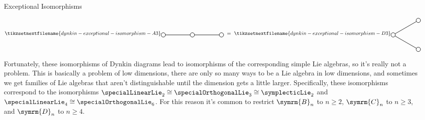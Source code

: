 \documentclass[fleqn]{NotesClass}
\newcommand{\isomorphic}{\cong}
\newcommand{\dynkin}[2]{\symrm{#1}_{#2}}
\begin{document}
\begin{remark}{Exceptional Isomorphisms}{}
\begin{itemize}
\begin{equation}
                \tikzsetnextfilename{dynkin-exceptional-isomorphism-A3}
                \begin{tikzpicture}[baseline=(current bounding box)]
                    \draw[thick] (0, 0) -- (4, 0);
                    \draw[thick, fill=white] (0, 0) circle [radius=0.15];
                    \draw[thick, fill=white] (2, 0) circle [radius=0.15];
                    \draw[thick, fill=white] (4, 0) circle [radius=0.15];
                \end{tikzpicture}
                \ =\ 
                \tikzsetnextfilename{dynkin-exceptional-isomorphism-D3}
                \begin{tikzpicture}[baseline=(current bounding box)]
                    \draw[thick] (0, 0) -- ++ (30:2);
                    \draw[thick] (0, 0) -- ++ (-30:2);
                    \draw[thick, fill=white] (0, 0) circle [radius=0.15];
                    \draw[thick, fill=white] (30:2) circle [radius=0.15];
                    \draw[thick, fill=white] (-30:2) circle [radius=0.15];
                \end{tikzpicture}
            \end{equation}
        \end{itemize}
        Fortunately, these isomorphisms of Dynkin diagrams lead to isomorphisms of the corresponding simple Lie algebras, so it's really not a problem.
        This is basically a problem of low dimensions, there are only so many ways to be a Lie algebra in low dimensions, and sometimes we get families of Lie algebras that aren't distinguishable until the dimension gets a little larger.
        Specifically, these isomorphisms correspond to the isomorphisms \(\specialLinearLie_2 \isomorphic \specialOrthogonalLie_3 \isomorphic \symplecticLie_2\) and \(\specialLinearLie_4 \isomorphic \specialOrthogonalLie_6\).
        For this reason it's common to restrict \(\dynkin{B}{n}\) to \(n \ge 2\), \(\dynkin{C}{n}\) to \(n \ge 3\), and \(\dynkin{D}{n}\) to \(n \ge 4\).
    \end{remark}
    
%	
	
	\backmatter
	\renewcommand{\glossaryname}{Acronyms}
	\printglossary[acronym]
	\printindex
\end{document}
